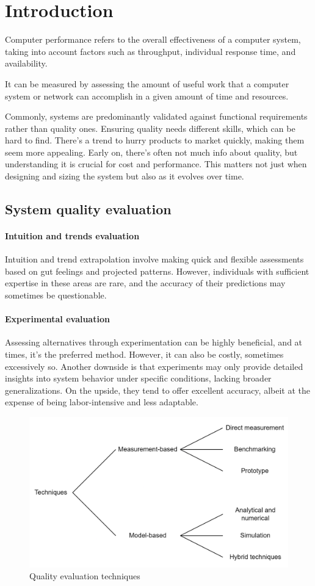 \section{Introduction}

\begin{definition}
    Computer performance refers to the overall effectiveness of a computer system, taking into account factors such as throughput, individual response time, and availability.
\end{definition}
It can be measured by assessing the amount of useful work that a computer system or network can accomplish in a given amount of time and resources.

Commonly, systems are predominantly validated against functional requirements rather than quality ones. 
Ensuring quality needs different skills, which can be hard to find. 
There's a trend to hurry products to market quickly, making them seem more appealing. 
Early on, there's often not much info about quality, but understanding it is crucial for cost and performance.
This matters not just when designing and sizing the system but also as it evolves over time.

\subsection{System quality evaluation}
\paragraph*{Intuition and trends evaluation}
Intuition and trend extrapolation involve making quick and flexible assessments based on gut feelings and projected patterns. 
However, individuals with sufficient expertise in these areas are rare, and the accuracy of their predictions may sometimes be questionable.
\paragraph*{Experimental evaluation}
Assessing alternatives through experimentation can be highly beneficial, and at times, it's the preferred method. 
However, it can also be costly, sometimes excessively so. 
Another downside is that experiments may only provide detailed insights into system behavior under specific conditions, lacking broader generalizations.
On the upside, they tend to offer excellent accuracy, albeit at the expense of being labor-intensive and less adaptable.
\begin{figure}[H]
    \centering
    \includegraphics[width=0.5\linewidth]{images/eva.png}
    \caption{Quality evaluation techniques}
\end{figure}

